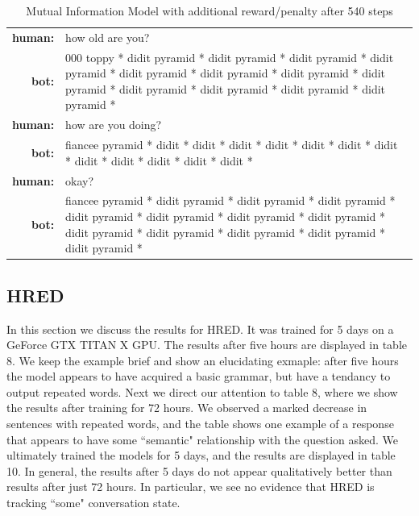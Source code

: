 \documentclass[letterpaper]{article}
\begin{document}
\begin{table}[bt!]
    \centering
    \small
    \caption{\small Mutual Information Model with additional reward/penalty after 540 steps}
    \begin{tabularx}{0.48\textwidth}{rX}
        \hline \hline
        \textbf{human:} & how old are you?    \\
        \textbf{bot:} & 000 toppy * didit pyramid * didit pyramid * didit pyramid * didit pyramid * didit pyramid * didit pyramid * didit pyramid * didit pyramid * didit pyramid * didit pyramid * didit pyramid * didit pyramid *\\
        \textbf{human:} & how are you doing? \\
        \textbf{bot:} & fiancee pyramid * didit * didit * didit * didit * didit * didit * didit * didit * didit * didit * didit * didit *\\
        \textbf{human:} & okay? \\
        \textbf{bot:} & fiancee pyramid * didit pyramid * didit pyramid * didit pyramid * didit pyramid * didit pyramid * didit pyramid * didit pyramid * didit pyramid * didit pyramid * didit pyramid * didit pyramid * didit pyramid * \\
        \hline \hline    
    \end{tabularx}
    \label{table:mi_03}
\end{table}


\subsection{HRED}

In this section we discuss the results for HRED. It was trained for 5 days on a GeForce GTX TITAN X GPU. The results after five hours are displayed in table 8. We keep the example brief and show an elucidating exmaple: after five hours the model appears to have acquired a basic grammar, but have a tendancy to output repeated words. Next we direct our attention to table 8, where we show the results after training for 72 hours. We observed a marked decrease in sentences with repeated words, and the table shows one example of a response that appears to have some ``semantic" relationship with the question asked. We ultimately trained the models for 5 days, and the results are displayed in table 10. In general, the results after 5 days do not appear qualitatively better than results after just 72 hours. In particular, we see no evidence that HRED is tracking ``some" conversation state. 
\end{document}
